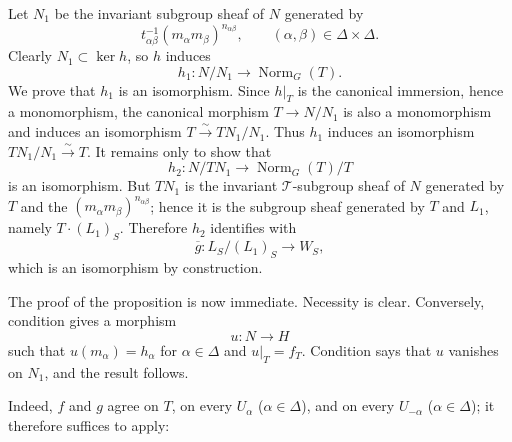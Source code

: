 Let \(N_1\) be the invariant subgroup sheaf of \(N\) generated by
\[
  t_{\alpha\beta}^{-1}(m_\alpha m_\beta)^{n_{\alpha\beta}},
  \qquad(\alpha,\beta)\in\Delta\times\Delta.
\]
Clearly \(N_1\subset\ker h\), so \(h\) induces
\[
  h_1:N/N_1\longrightarrow\operatorname{Norm}_G(T).
\]
We prove that \(h_1\) is an isomorphism. Since \(h|_T\) is the
canonical immersion, hence a monomorphism, the canonical morphism
\(T\to N/N_1\) is also a monomorphism and induces an isomorphism
\(T\xrightarrow{\sim}TN_1/N_1\). Thus \(h_1\) induces an
isomorphism \(TN_1/N_1\xrightarrow{\sim}T\). It remains only to show
that
\[
  h_2:N/TN_1\longrightarrow\operatorname{Norm}_G(T)/T
\]
is an isomorphism. But \(TN_1\) is the invariant
\(\mathcal T\)-subgroup sheaf of \(N\) generated by \(T\) and the
\((m_\alpha m_\beta)^{n_{\alpha\beta}}\); hence it is the subgroup
sheaf generated by \(T\) and \(L_1\), namely \(T\cdot(L_1)_S\).
Therefore \(h_2\) identifies with
\[
  \overline g:L_S/(L_1)_S\longrightarrow W_S,
\]
which is an isomorphism by construction.

The proof of the proposition is now immediate. Necessity is clear.
Conversely, condition  gives a morphism
\[
  u:N\longrightarrow H
\]
such that \(u(m_\alpha)=h_\alpha\) for \(\alpha\in\Delta\) and
\(u|_T=f_T\). Condition  says that \(u\) vanishes on \(N_1\),
and the result follows.



Indeed, \(f\) and \(g\) agree on \(T\), on every \(U_\alpha\)
(\(\alpha\in\Delta\)), and on every \(U_{-\alpha}\)
(\(\alpha\in\Delta\)); it therefore suffices to apply:


